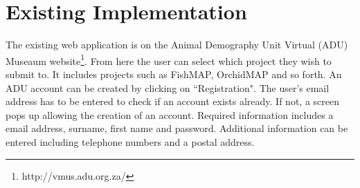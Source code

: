\documentclass[12pt,a4paper,oneside]{report}
\begin{document}
\section{Existing Implementation}
  \begin{spacing}{1.4}
    The existing web application is on the Animal Demography Unit Virtual (ADU) Museaum website\footnote{http://vmus.adu.org.za/}.
    From here the user can select which project they wish to submit to. It includes projects such as FishMAP, OrchidMAP and so forth.
    An ADU account can be created by clicking on ``Registration". The user's email address has to be entered to check if an account exists
    already. If not, a screen pops up allowing the creation of an account. Required information includes a email address, surname, first name and
    password. Additional information can be entered including telephone numbers and a postal address.


\end{spacing}
\end{document}
